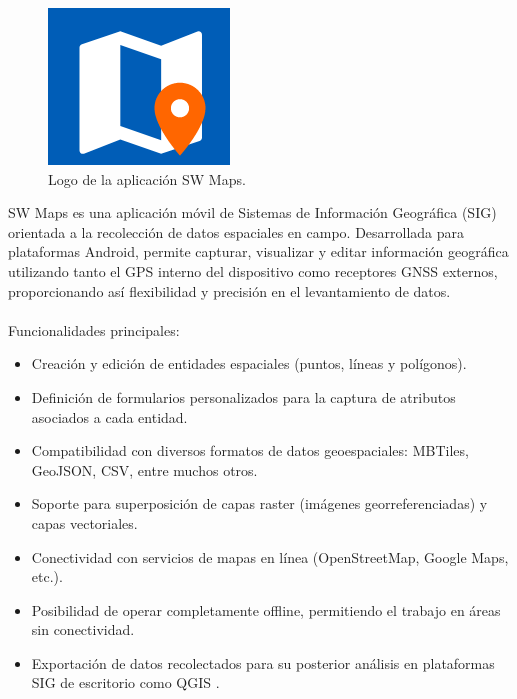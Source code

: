 \begin{figure}[h]
    \centering
    \includegraphics[scale=0.5]{Graphics/sw_maps_logo.png}
    \caption{Logo de la aplicación SW Maps.}
    \label{fig:figura7}
\end{figure}
SW Maps es una aplicación móvil de Sistemas de Información Geográfica (SIG) orientada a la recolección de datos espaciales en campo. Desarrollada para plataformas Android, permite capturar, visualizar y editar información geográfica utilizando tanto el GPS interno del dispositivo como receptores GNSS externos, proporcionando así flexibilidad y precisión en el levantamiento de datos.\\\\
Funcionalidades principales:
\begin{itemize}
    \item Creación y edición de entidades espaciales (puntos, líneas y polígonos).
    \item Definición de formularios personalizados para la captura de atributos asociados a cada entidad.
    \item Compatibilidad con diversos formatos de datos geoespaciales: MBTiles, GeoJSON, CSV, entre muchos otros.
    \item Soporte para superposición de capas raster (imágenes georreferenciadas) y capas vectoriales.
    \item Conectividad con servicios de mapas en línea (OpenStreetMap, Google Maps, etc.).
    \item Posibilidad de operar completamente offline, permitiendo el trabajo en áreas sin conectividad.
    \item Exportación de datos recolectados para su posterior análisis en plataformas SIG de escritorio como QGIS \cite{qgis}.
\end{itemize}

